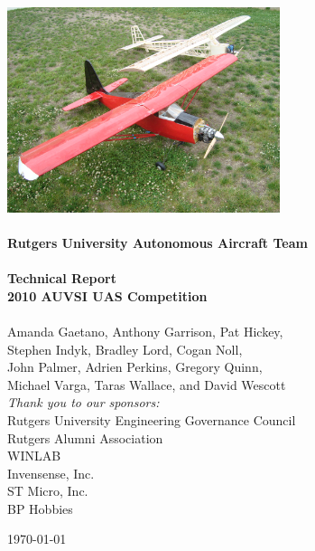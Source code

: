 \begin{titlepage}
\begin{center}

\includegraphics[width=0.6\textwidth]{../images/bothplanes_isometric.jpg}\\[7mm]
\HRule \\[7mm]
{ \huge \bfseries Rutgers University Autonomous Aircraft Team } \\[0.4cm]
\HRule \\[0.4cm]
{ \large \bfseries Technical Report }
\\[0.4cm]
{ \large \bfseries 2010 AUVSI UAS Competition }
\\[0.3cm]
\HRule \\[7mm]

  {\large Amanda Gaetano, Anthony Garrison, Pat Hickey,}
\\{\large Stephen Indyk, Bradley Lord, Cogan Noll,}
\\{\large John Palmer, Adrien Perkins, Gregory Quinn,}
\\{\large Michael Varga, Taras Wallace, and David Wescott}
\\[1cm]
\emph{Thank you to our sponsors:}
\\ Rutgers University Engineering Governance Council
\\ Rutgers Alumni Association
\\ WINLAB
\\ Invensense, Inc.
\\ ST Micro, Inc.
\\ BP Hobbies

\vfill
{\large \today}

\end{center}
\end{titlepage}
